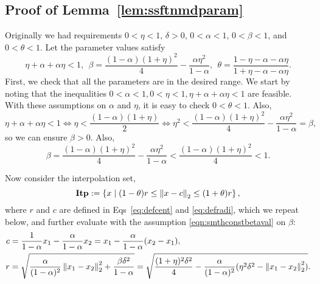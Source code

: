 \subsection{Proof of Lemma~\ref{lem:ssftnmdparam}}
\label{sec:proof-ssftnmdparam}
Originally we had requirements $0<\eta<1$, $\delta > 0$, $0<\alpha<1$, $0<\beta<1$, and $0<\theta<1$.
Let the parameter values satisfy
\begin{equation*}
	\eta+\alpha+\alpha\eta < 1 ,~~
	\beta = \frac{(1-\alpha)(1+\eta)^2}{4} - \frac{\alpha \eta^2}{1-\alpha},~~
	\theta = \frac{1-\eta-\alpha-\alpha\eta}{1+\eta-\alpha-\alpha\eta}.
\end{equation*}
First, we check that all the parameters are in the desired range. We start by noting that the inequalities $0<\alpha<1, 0<\eta<1, \eta+\alpha+\alpha\eta < 1$ are feasible.
With these assumptions on $\alpha$ and $\eta$, it is easy to check $0< \theta<1$.
Also, 
\begin{equation*}
	\eta+\alpha+\alpha\eta < 1 
	\iff
	\eta < \frac{(1-\alpha)(1+\eta)}{2} 
	\iff 
	\eta^2 < \frac{(1-\alpha)(1+\eta)^2}{4} - \frac{\alpha \eta^2}{1-\alpha} = \beta,
\end{equation*}
so we can ensure $\beta > 0$.
Also,
\begin{equation*}
	\beta = \frac{(1-\alpha)(1+\eta)^2}{4} - \frac{\alpha \eta^2}{1-\alpha} < \frac{(1-\alpha)(1+\eta)^2}{4} < 1.
\end{equation*}

Now consider the interpolation set,
\begin{equation*}
	\mathbf{Itp} := \left \{ x \mid (1-\theta)r \leq \left\|{x-c}\right\|_2 \leq (1+\theta)r \right \},
\end{equation*}
where $r$ and $c$ are defined in Eqs~\eqref{eq:defcent} and \eqref{eq:defradi},
which we repeat below, and further evaluate with the assumption \eqref{eqn:smthconstbetaval} on $\beta$:
\begin{align*}
	c &= \frac{1}{1-\alpha} x_1 - \frac{\alpha}{1-\alpha} x_2 = x_1 - \frac{\alpha}{1-\alpha} (x_2-x_1),\\
	r &= \sqrt{\frac{\alpha}{(1-\alpha)^2} \left\|{x_1-x_2}\right\|_2^2 + \frac{\beta\delta^2}{1-\alpha}}
	=\sqrt{\frac{(1+\eta)^2 \delta^2}{4}-\frac{\alpha}{(1-\alpha)^2} (\eta^2 \delta^2-\left\|{x_1-x_2}\right\|_2^2)}.
\end{align*}

